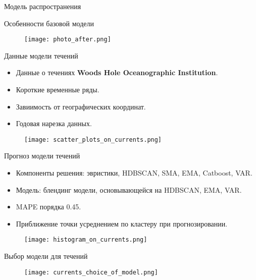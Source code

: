 \documentclass{beamer}
\begin{document}
\begin{section}{Модель распространения}
\begin{frame}{Особенности базовой модели}
\begin{figure}[H]
	\centering
	\texttt{[image: photo\_after.png]}
\end{figure}
\end{frame}

\begin{frame}{Данные модели течений}
\begin{itemize}
	\item Данные о течениях \textbf{Woods Hole Oceanographic Institution}.
	\item Короткие временные ряды.
	\item Завиимость от географических координат.
	\item Годовая нарезка данных.
\end{itemize}

\begin{figure}[H]
	\centering
	\texttt{[image: scatter\_plots\_on\_currents.png]}
\end{figure}
\end{frame}

\begin{frame}{Прогноз модели течений}
\begin{itemize}
	\item Компоненты решения: эвристики, HDBSCAN, SMA, EMA, Catboost, VAR.
	\item Модель: блендинг модели, основывающейся на HDBSCAN, EMA, VAR.
	\item MAPE порядка 0.45.
	\item Приближение точки усреднением по кластеру при прогнозировании.
\end{itemize}

\begin{figure}[H]
	\centering
	\texttt{[image: histogram\_on\_currents.png]}
\end{figure}

\end{frame}

\begin{frame}{Выбор модели для течений}

\begin{figure}[H]
	\centering
	\texttt{[image: currents\_choice\_of\_model.png]}
\end{figure}

\end{frame}


\end{section}
\end{document}
